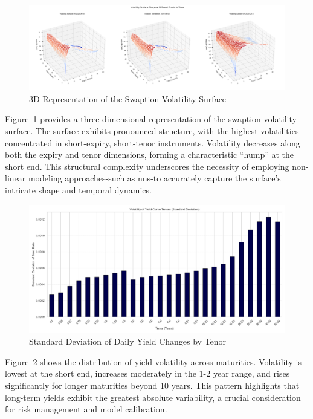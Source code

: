 \begin{figure}[H]
	\centering
	\includegraphics[width=1\textwidth]{images/descriptive_data_analysis/vol_surface_3d_snapshots.png}
	\caption{3D Representation of the Swaption Volatility Surface}
	\label{fig:vol_surface_3d_snapshots}
\end{figure}

Figure~\ref{fig:vol_surface_3d_snapshots} provides a three-dimensional representation of the swaption volatility surface. The surface exhibits pronounced structure, with the highest volatilities concentrated in short-expiry, short-tenor instruments. Volatility decreases along both the expiry and tenor dimensions, forming a characteristic “hump” at the short end. This structural complexity underscores the necessity of employing non-linear modeling approaches-such as \ac{nn}s-to accurately capture the surface's intricate shape and temporal dynamics.

\begin{figure}[H]
	\centering
	\includegraphics[width=1\textwidth]{images/descriptive_data_analysis/yield_curve_std_by_tenor.png}
	\caption{Standard Deviation of Daily Yield Changes by Tenor}
	\label{fig:yield_curve_std_by_tenor}
\end{figure}

Figure~\ref{fig:yield_curve_std_by_tenor} shows the distribution of yield volatility across maturities. Volatility is lowest at the short end, increases moderately in the 1-2 year range, and rises significantly for longer maturities beyond 10 years. This pattern highlights that long-term yields exhibit the greatest absolute variability, a crucial consideration for risk management and model calibration.

